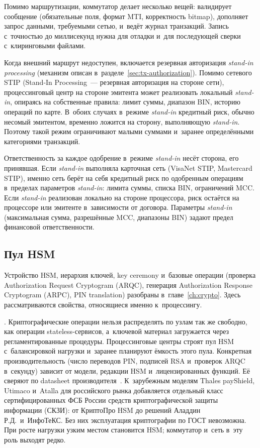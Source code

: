 Помимо маршрутизации, коммутатор делает несколько вещей: валидирует
сообщение (обязательные поля, формат MTI, корректность bitmap),
дополняет запрос данными, требуемыми сетью, и~ведёт журнал транзакций.
Запись с~точностью до миллисекунд нужна для отладки
и~для последующей сверки с~клиринговыми файлами.

Когда внешний маршрут недоступен, включается резервная
авторизация \textit{stand-in processing} (механизм описан
в~разделе~\autoref{sec:tx-authorization}). Помимо сетевого STIP (Stand-In Processing~--- резервная авторизация на стороне сети),
процессинговый центр на стороне эмитента может реализовать
локальный \textit{stand-in}, опираясь на собственные правила: лимит
суммы, диапазон BIN, историю операций по карте.
В~обоих случаях в~режиме \textit{stand-in} кредитный риск, обычно
несомый эмитентом, временно ложится на сторону, выполняющую
\textit{stand-in}. Поэтому такой режим ограничивают
малыми суммами и~заранее определёнными категориями
транзакций.~\cite{visa-core-rules,mc-rules}

Ответственность за каждое одобрение в~режиме \textit{stand-in} несёт сторона, его принявшая.
Если \textit{stand-in} выполняла карточная сеть (VisaNet STIP,
Mastercard STIP), именно сеть берёт на себя кредитный риск
по одобренным операциям в~пределах параметров \textit{stand-in}:
лимита суммы, списка BIN, ограничений MCC. Если \textit{stand-in}
реализован локально на стороне процессора, риск остаётся
на процессоре или эмитенте в~зависимости от договора.
Параметры \textit{stand-in} (максимальная сумма, разрешённые MCC,
диапазоны BIN) задают предел финансовой ответственности.

\subsection*{Пул HSM}

Устройство HSM, иерархия ключей, key ceremony и~базовые операции
(проверка Authorization Request Cryptogram (ARQC), генерация Authorization Response Cryptogram (ARPC), PIN translation) разобраны
в~главе~\autoref{ch:crypto}. Здесь рассматриваются свойства, относящиеся именно
к~процессингу.

.
Криптографические операции нельзя распределять по узлам так же свободно,
как операции stateless-сервисов, а~ключевой материал загружается через
регламентированные процедуры. Процессинговые центры строят пул HSM
с~балансировкой нагрузки и~заранее планируют ёмкость этого пула.
Конкретная производительность (число переводов PIN, подписей RSA
и~проверок ARQC в~секунду) зависит от модели, редакции HSM
и~лицензированных функций. Её сверяют по datasheet
производителя~\cite{pci-pin-security,pci-pts-hsm,ansi-x9-24}.
К~зарубежным моделям Thales payShield, Utimaco и~Atalla
для российского рынка добавляется отдельный класс сертифицированных
ФСБ России средств криптографической защиты информации (СКЗИ): от КриптоПро HSM до решений Аладдин Р.Д.\
и~ИнфоТеКС. Без них эксплуатация криптографии по ГОСТ невозможна.
При росте нагрузки узким местом становится HSM; коммутатор
и~сеть в~эту роль выходят редко.

